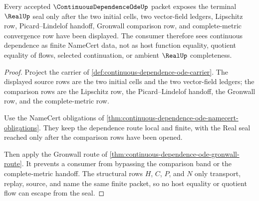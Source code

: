 \begin{theorem}
\label{thm:continuous-dependence-ode-real-seal-nonescape}
Every accepted $\ContinuousDependenceOdeUp$ packet exposes the terminal $\RealUp$ seal only after the two initial cells, two vector-field ledgers, Lipschitz row, Picard--Lindelof handoff, Gronwall comparison row, and complete-metric convergence row have been displayed. The consumer therefore sees continuous dependence as finite NameCert data, not as host function equality, quotient equality of flows, selected continuation, or ambient $\RealUp$ completeness.
\end{theorem}
\begin{proof}
Project the carrier of \autoref{def:continuous-dependence-ode-carrier}. The displayed source rows are the two initial cells and the two vector-field ledgers; the comparison rows are the Lipschitz row, the Picard--Lindelof handoff, the Gronwall row, and the complete-metric row.

Use the NameCert obligations of \autoref{thm:continuous-dependence-ode-namecert-obligations}. They keep the dependence route local and finite, with the Real seal reached only after the comparison rows have been opened.

Then apply the Gronwall route of \autoref{thm:continuous-dependence-ode-gronwall-route}. It prevents a consumer from bypassing the comparison band or the complete-metric handoff. The structural rows $H$, $C$, $P$, and $N$ only transport, replay, source, and name the same finite packet, so no host equality or quotient flow can escape from the seal.
\end{proof}



